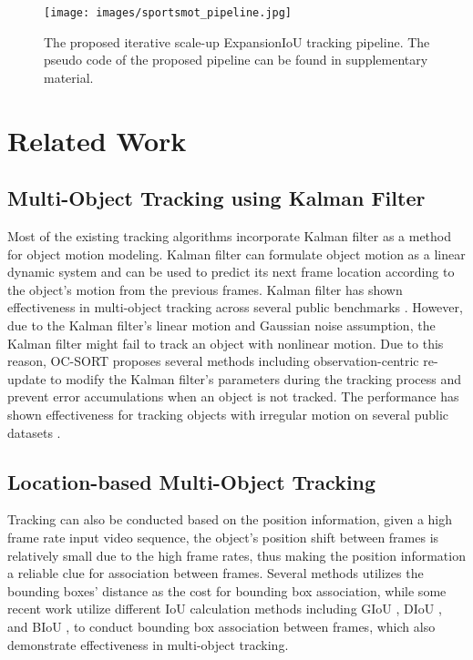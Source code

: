 \documentclass[10pt,twocolumn,letterpaper]{article}
\begin{document}
\begin{figure*}[t]
  \centering
  \texttt{[image: images/sportsmot\_pipeline.jpg]}
  \caption{The proposed iterative scale-up ExpansionIoU tracking pipeline. The pseudo code of the proposed pipeline can be found in supplementary material.}
\end{figure*}

\section{Related Work}
\subsection{Multi-Object Tracking using Kalman Filter}
Most of the existing tracking algorithms \cite{ByteTrack,SORT,OCSORT,DeepSORT,zhang2021fairmot,yang2023multiobject,huang2023observation,huang2023multi,huang2023enhancing,yang2023sea} incorporate Kalman filter \cite{kf} as a method for object motion modeling. Kalman filter can formulate object motion as a linear dynamic system and can be used to predict its next frame location according to the object's motion from the previous frames. Kalman filter has shown effectiveness in multi-object tracking across several public benchmarks \cite{mot16,dendorfer2020mot20,sun2022dancetrack}. However, due to the Kalman filter's linear motion and Gaussian noise assumption, the Kalman filter might fail to track an object with nonlinear motion. Due to this reason, OC-SORT \cite{OCSORT} proposes several methods including observation-centric re-update to modify the Kalman filter's parameters during the tracking process and prevent error accumulations when an object is not tracked. The performance has shown effectiveness for tracking objects with irregular motion on several public datasets \cite{sun2022dancetrack,cui2023sportsmot}.

\subsection{Location-based Multi-Object Tracking}
Tracking can also be conducted based on the position information, given a high frame rate input video sequence, the object's position shift between frames is relatively small due to the high frame rates, thus making the position information a reliable clue for association between frames. Several methods \cite{stone2000centertrack,huang2023observation} utilizes the bounding boxes' distance as the cost for bounding box association, while some recent work \cite{yang2023hard} utilize different IoU calculation methods including GIoU \cite{rezatofighi2019generalized}, DIoU \cite{zheng2020distance}, and BIoU \cite{yang2023hard}, to conduct bounding box association between frames, which also demonstrate effectiveness in multi-object tracking.
\end{document}
